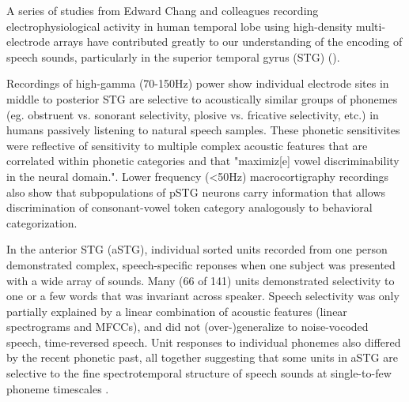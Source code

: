 A series of studies from Edward Chang and colleagues recording electrophysiological activity in human temporal lobe using high-density multi-electrode arrays have contributed greatly to our understanding of the encoding of speech sounds, particularly in the superior temporal gyrus (STG) ()\cite{yiEncodingSpeechSounds2019}. 

Recordings of high-gamma (70-150Hz) power show individual electrode sites in middle to posterior STG are selective to acoustically similar groups of phonemes (eg. obstruent vs. sonorant selectivity, plosive vs. fricative selectivity, etc.) in humans passively listening to natural speech samples\cite{mesgaraniPhoneticFeatureEncoding2014}. These phonetic sensitivites were reflective of sensitivity to multiple complex acoustic features that are correlated within phonetic categories and that "maximiz[e] vowel discriminability in the neural domain."\cite{mesgaraniPhoneticFeatureEncoding2014}. Lower frequency (<50Hz) macrocortigraphy recordings also show that subpopulations of pSTG neurons carry information that allows discrimination of consonant-vowel token category analogously to behavioral categorization\cite{changCategoricalSpeechRepresentation2010b}. 

In the anterior STG (aSTG), individual sorted units recorded from one person demonstrated complex, speech-specific reponses when one subject was presented with a wide array of sounds\cite{chanSpeechSpecificTuningNeurons2014}. Many (66 of 141) units demonstrated selectivity to one or a few words that was invariant across speaker. Speech selectivity was only partially explained by a linear combination of acoustic features (linear spectrograms and MFCCs), and did not (over-)generalize to noise-vocoded speech, time-reversed speech. Unit responses to individual phonemes also differed by the recent phonetic past, all together suggesting that some units in aSTG are selective to the fine spectrotemporal structure of speech sounds at single-to-few phoneme timescales \cite{chanSpeechSpecificTuningNeurons2014}. 

